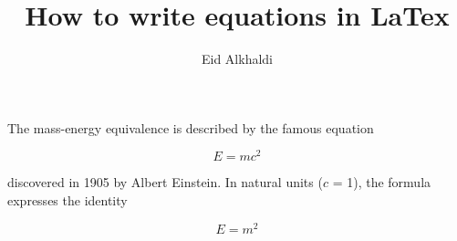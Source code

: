 \documentclass{article}
\author{Eid Alkhaldi}
\title{How to write equations in LaTex}
\begin{document}
The mass-energy equivalence is described by the famous equation

\[E=mc^2\]

discovered in 1905 by Albert Einstein. 
In natural units ($c$ = 1), the formula expresses the identity

\begin{equation}
  E=m^2
\end{equation}
\end{document}
